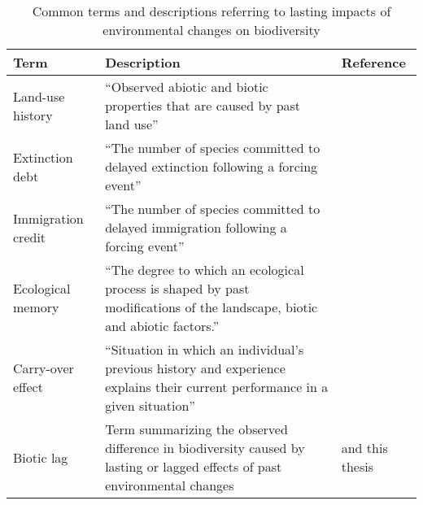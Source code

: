 \begin{table}[ht]
\caption{Common terms and descriptions referring to lasting impacts of environmental changes on biodiversity}
\label{T01_01}

\newcolumntype{b}{X}

\begin{tabularx}{\textwidth}{ sbm }
\toprule
\textbf{Term} & \textbf{Description} & \textbf{Reference}   \\
\midrule

Land-use history  &  “Observed abiotic and biotic properties that are caused by past land use” & \citep{Foster2003,Perring2015} \\

Extinction debt & “The number of species committed to delayed extinction following a forcing event” &  \citep{Tilman1994,Kuussaari2009} \\

Immigration credit & “The number of species committed to delayed immigration following a forcing event” & \citep{Jackson2010} \\

Ecological memory & “The degree to which an ecological process is shaped by past modifications of the landscape, biotic and abiotic factors.” & \citep{Padisak1992,Peterson2002,Bengtsson2003,Ogle2015} \\

Carry-over effect & “Situation in which an individual’s previous history and experience explains their current performance in a given situation” & \citep{Harrison2011,OConnor2014} \\

Biotic lag &  Term summarizing the observed difference in biodiversity caused by lasting or lagged effects of past environmental changes  & \citep{DePalma2018} and this thesis   \\ \bottomrule

\end{tabularx}

\end{table}